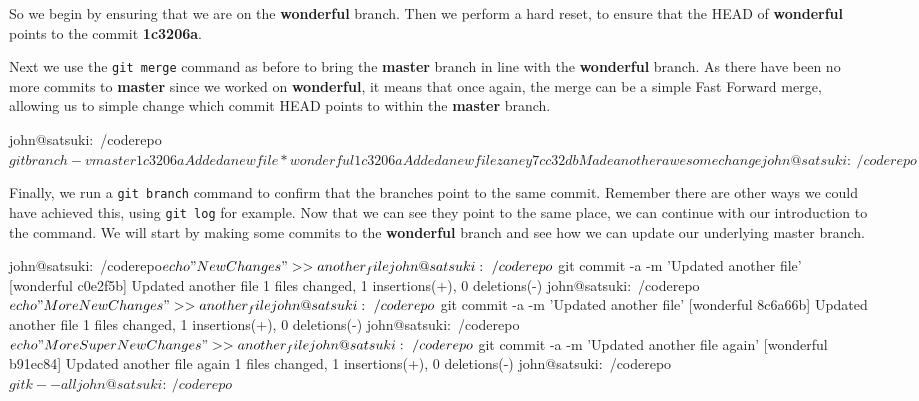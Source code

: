 So we begin by ensuring that we are on the \textbf{wonderful} branch.
Then we perform a hard reset, to ensure that the HEAD of \textbf{wonderful} points to the commit \textbf{1c3206a}.


Next we use the \texttt{git merge} command as before to bring the \textbf{master} branch in line with the \textbf{wonderful} branch.
As there have been no more commits to \textbf{master} since we worked on \textbf{wonderful}, it means that once again, the merge can be a simple Fast Forward merge, allowing us to simple change which commit HEAD points to within the \textbf{master} branch.

\begin{code}
john@satsuki:~/coderepo$ git branch -v
  master    1c3206a Added a new file
* wonderful 1c3206a Added a new file
  zaney     7cc32db Made another awesome change
john@satsuki:~/coderepo$
\end{code}

Finally, we run a \texttt{git branch} command to confirm that the branches point to the same commit.
Remember there are other ways we could have achieved this, using \texttt{git log} for example.
Now that we can see they point to the same place, we can continue with our introduction to the  command.
We will start by making some commits to the \textbf{wonderful} branch and see how we can update our underlying master branch.

\begin{code}
john@satsuki:~/coderepo$ echo "New Changes" >> another_file
john@satsuki:~/coderepo$ git commit -a -m 'Updated another file'
[wonderful c0e2f5b] Updated another file
 1 files changed, 1 insertions(+), 0 deletions(-)
john@satsuki:~/coderepo$ echo "More New Changes" >> another_file
john@satsuki:~/coderepo$ git commit -a -m 'Updated another file'
[wonderful 8c6a66b] Updated another file
 1 files changed, 1 insertions(+), 0 deletions(-)
john@satsuki:~/coderepo$ echo "More Super New Changes" >> another_file
john@satsuki:~/coderepo$ git commit -a -m 'Updated another file again'
[wonderful b91ec84] Updated another file again
 1 files changed, 1 insertions(+), 0 deletions(-)
john@satsuki:~/coderepo$ gitk --all
john@satsuki:~/coderepo$
\end{code}

